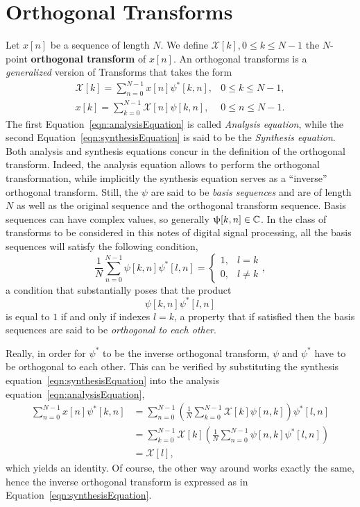 \documentclass[\documentfontsize, twocolumn]{\classname}
\begin{document}
\section{Orthogonal Transforms}

Let $x[n]$ be a sequence of length $N$. We define $\mathcal X[k], 0 \leq k \leq N-1$ the $N$-point \textbf{orthogonal transform} of $x[n]$. An orthogonal transforms is a \emph{generalized} version of Transforms that takes the form
\begin{eqnarray}
    \mathcal X[k] = \sum_{n=0}^{N-1} x[n] \psi^*[k,n], & 0 \leq k \leq N-1, \\\label{eqn:analysisEquation}
    x[k] = \sum_{k=0}^{N-1} \mathcal X[n] \psi[k,n], & 0 \leq n \leq N-1. \label{eqn:synthesisEquation}
\end{eqnarray}
The first Equation~\ref{eqn:analysisEquation} is called \emph{Analysis equation}, while the second Equation~\ref{eqn:synthesisEquation} is said to be the \emph{Synthesis equation}. Both analysis and synthesis equations concur in the definition of the orthogonal transform. Indeed, the analysis equation allows to perform the orthogonal transformation, while implicitly the synthesis equation serves as a ``inverse'' orthogonal transform. Still, the $\psi$ are said to be \emph{basis sequences} and are of length $N$ as well as the original sequence and the orthogonal transform sequence. Basis sequences can have complex values, so generally $\uppsi[k, n] \in \mathbb C$. In the class of transforms to be considered in this notes of digital signal processing, all the basis sequences will satisfy the following condition,
\begin{equation}\label{eqn:orthogonalTransformsOrthogonalityCondition}
    \frac 1 N \sum_{n=0}^{N-1} \psi[k,n]\psi^*[l,n] = \left\{\begin{array}{ll}1, & l = k\\ 0, & l \neq k\end{array}\right.,
\end{equation}
a condition that substantially poses that the product \[\psi[k,n]\psi^*[l,n]\] is equal to $1$ if and only if indexes $l = k$, a property that if satisfied then the basis sequences are said to be \emph{orthogonal to each other}.

Really, in order for $\psi^*$ to be the inverse orthogonal transform, $\psi$ and $\psi^*$ have to be orthogonal to each other. This can be verified by substituting the synthesis equation~\ref{eqn:synthesisEquation} into the analysis equation~\ref{eqn:analysisEquation},
\begin{align*}
    \sum_{n=0}^{N-1} x[n] \psi^*[k,n] &= \sum_{n=0}^{N-1}\left( \frac 1 N \sum_{k=0}^{N-1} \mathcal X[k] \psi[n,k]\right)\psi^*[l,n] \\
                                      &= \sum_{k=0}^{N-1} \mathcal X[k] \left( \frac 1 N \sum_{n=0}^{N-1}\psi[n,k]\psi^*[l,n]\right) \\
                                      &= \mathcal X[l],
\end{align*}
which yields an identity. Of course, the other way around works exactly the same, hence the inverse orthogonal transform is expressed as in Equation~\ref{eqn:synthesisEquation}.
\end{document}
